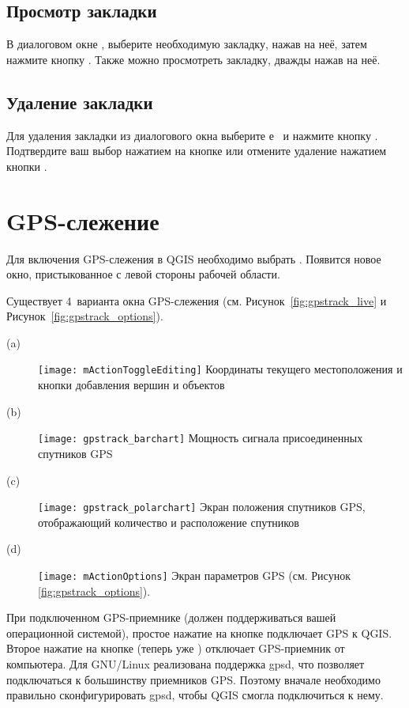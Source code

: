 \subsection{Просмотр закладки}
В диалоговом окне , выберите необходимую
закладку, нажав на неё, затем нажмите кнопку . Также
можно просмотреть закладку, дважды нажав на неё.

\subsection{Удаление закладки}
Для удаления закладки из диалогового окна 
выберите е~ и нажмите кнопку . Подтвердите ваш выбор
нажатием на кнопке  или отмените удаление нажатием кнопки
.

\section{GPS-слежение}\label{sec:gpstracking}

Для включения GPS-слежения в QGIS необходимо выбрать 
\arrow {}. Появится новое окно, пристыкованное
с левой стороны рабочей области.

Существует 4~варианта окна GPS-слежения (см. Рисунок~\ref{fig:gpstrack_live}
и Рисунок~\ref{fig:gpstrack_options}).

\begin{description}
 \item[(a)] \texttt{[image: mActionToggleEditing]}
 Координаты текущего местоположения и кнопки добавления вершин и объектов
 \item[(b)] \texttt{[image: gpstrack\_barchart]}
 Мощность сигнала присоединенных спутников GPS
 \item[(c)] \texttt{[image: gpstrack\_polarchart]}
 Экран положения спутников GPS, отображающий количество и расположение спутников
 \item[(d)] \texttt{[image: mActionOptions]}
 Экран параметров GPS (см. Рисунок \ref{fig:gpstrack_options}).
\end{description}

При подключенном GPS-приемнике (должен поддерживаться вашей операционной
системой), простое нажатие на кнопке  подключает
GPS к QGIS. Второе нажатие на кнопке (теперь уже )
отключает GPS-приемник от компьютера. Для GNU/Linux реализована поддержка
gpsd, что позволяет подключаться к большинству приемников GPS. Поэтому
вначале необходимо правильно сконфигурировать gpsd, чтобы QGIS смогла
подключиться к нему.

